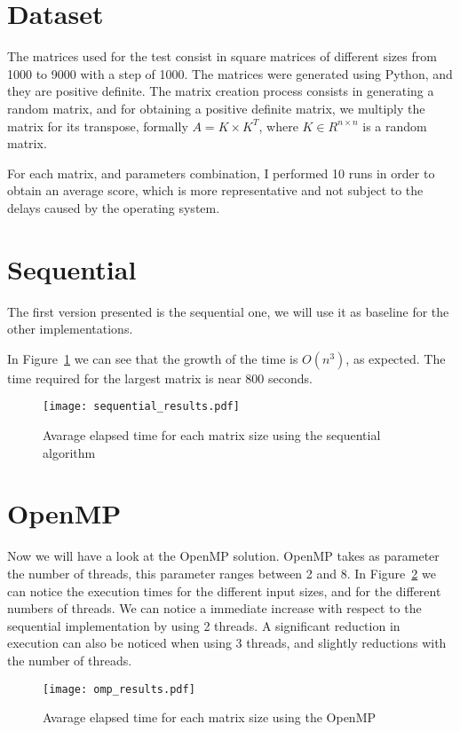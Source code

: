 \section{Dataset}
\label{Dataset}
The matrices used for the test consist in square matrices of different sizes from 1000 to 9000 with a step of 1000. The matrices were generated using Python, and they are positive definite. The matrix creation process consists in generating a random matrix, and for obtaining a positive definite matrix, we multiply the matrix for its transpose, formally $A = K \times K^{T}$, where $K \in R^{n \times n}$ is a random matrix. 

For each matrix, and parameters combination, I performed 10 runs in order to obtain an average score, which is more representative and not subject to the delays caused by the operating system.

\section{Sequential}
The first version presented is the sequential one, we will use it as baseline for the other implementations. 

In Figure~\ref{fig:res_sequential} we can see that the growth of the time is $O(n^3)$, as expected. The time required for the largest matrix is near 800 seconds.

\begin{figure}[H]
\centering
\texttt{[image: sequential\_results.pdf]}
\caption{Avarage elapsed time for each matrix size using the sequential algorithm}
\label{fig:res_sequential}
\end{figure}


\section{OpenMP}
Now we will have a look at the OpenMP solution. OpenMP takes as parameter the number of threads, this parameter ranges between 2 and 8. In Figure~\ref{fig:res_omp} we can notice the execution times for the different input sizes, and for the different numbers of threads. We can notice a immediate increase with respect to the sequential implementation by using 2 threads. A significant reduction in execution can also be noticed when using 3 threads, and slightly reductions with the number of threads.

\begin{figure}[H]
\centering
\texttt{[image: omp\_results.pdf]}
\caption{Avarage elapsed time for each matrix size using the OpenMP}
\label{fig:res_omp}
\end{figure}

